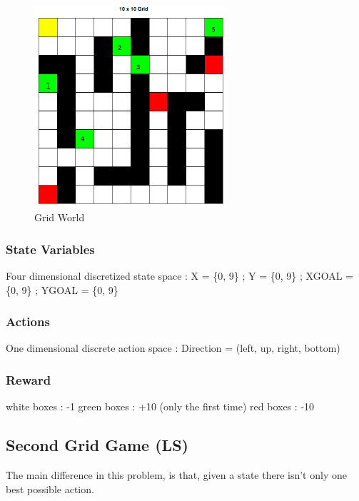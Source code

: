 \documentclass[a4paper,12pt]{article}
\begin{document}
    \begin{figure}[H]
      \begin{center}
	\includegraphics[width=270px]{gridworld}
	\caption{ Grid World }
	\end{center}
    \end{figure}
    
    \subsubsection{State Variables}
    Four dimensional discretized state space :\newline
    X = \{0, 9\} ; Y = \{0, 9\} ; XGOAL = \{0, 9\} ; YGOAL = \{0, 9\}
    
    \subsubsection{Actions}
    One dimensional discrete action space : Direction = (left, up, right, bottom)

     \subsubsection{Reward}
      white boxes : -1 \newline
      green boxes : +10 (only the first time)\newline
      red boxes : -10 \newline
    
    \subsection{Second Grid Game (LS)}

    The main difference in this problem, is that, given a state there isn't only one best possible action.
     
\end{document}
